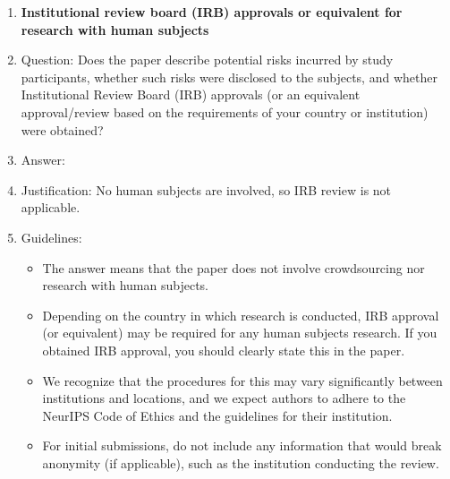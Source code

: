 \begin{enumerate}
\item {\bf Institutional review board (IRB) approvals or equivalent for research with human subjects}
    \item[] Question: Does the paper describe potential risks incurred by study participants, whether such risks were disclosed to the subjects, and whether Institutional Review Board (IRB) approvals (or an equivalent approval/review based on the requirements of your country or institution) were obtained?
    \item[] Answer: \answerNA{}
    \item[] Justification: No human subjects are involved, so IRB review is not applicable.
    \item[] Guidelines:
    \begin{itemize}
        \item The answer \answerNA{} means that the paper does not involve crowdsourcing nor research with human subjects.
        \item Depending on the country in which research is conducted, IRB approval (or equivalent) may be required for any human subjects research. If you obtained IRB approval, you should clearly state this in the paper. 
        \item We recognize that the procedures for this may vary significantly between institutions and locations, and we expect authors to adhere to the NeurIPS Code of Ethics and the guidelines for their institution. 
        \item For initial submissions, do not include any information that would break anonymity (if applicable), such as the institution conducting the review.
    \end{itemize}


\end{enumerate}

